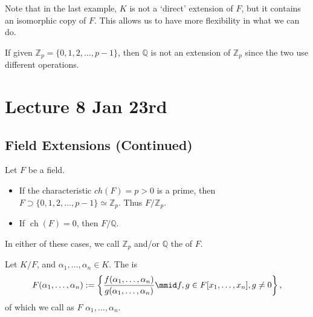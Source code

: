\documentclass[notoc,notitlepage]{tufte-book}
\DeclareMathOperator{\ch}{ch}
\begin{document}
\begin{note}
  Note that in the last example, $K$ is not a `direct' extension of $F$, but it contains an isomorphic
  copy of $F$. This allows us to have more flexibility in what we can do.
\end{note}

\begin{warning}
  If given $\mathbb{Z}_p = \{ 0, 1, 2, \ldots, p - 1 \}$, then $\mathbb{Q}$ is not an extension of
  $\mathbb{Z}_p$ since the two use different operations.
\end{warning}



\chapter{Lecture 8 Jan 23rd}%
\label{chp:lecture_8_jan_23rd}

\section{Field Extensions (Continued)}%
\label{sec:field_extensions_continued}

\begin{eg}
  Let $F$ be a field.
  \begin{itemize}
    \item If the characteristic $ch(F) = p > 0$ is a prime, then 
      $F \supset \{ 0, 1, 2, \ldots, p - 1 \} \simeq \mathbb{Z}_p$.
      Thus $F / \mathbb{Z}_p$.
    \item If $\ch(F) = 0$, then $F / \mathbb{Q}$.
  \end{itemize}
  In either of these cases, we call $\mathbb{Z}_p$ and/or $\mathbb{Q}$ the  of
  $F$.
\end{eg}

\begin{defn}\label{defn:generated_field_extension}
  Let $K / F$, and $\alpha_1, \ldots, \alpha_n \in K$. The  is
  \begin{equation*}
    F(\alpha_1, \ldots, \alpha_n) 
    := \left\{ \frac{f(\alpha_1, \ldots, \alpha_n)}{g(\alpha_1, \ldots, \alpha_n)} \mmid f, g \in F[x_1, \ldots, x_n], g \neq 0 \right\},
  \end{equation*}
  of which we call as $F$  $\alpha_1, \ldots, \alpha_n$.
\end{defn}
\end{document}
